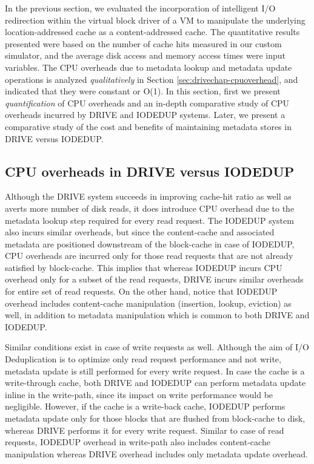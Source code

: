 
In the previous section, we evaluated the incorporation of
intelligent I/O redirection within the virtual block driver of a VM
to manipulate the underlying location-addressed cache as a content-addressed cache.
The quantitative results presented were based on the number of cache hits 
measured in our custom simulator, and the average disk access and memory 
access times were input variables. The CPU overheads due to metadata 
lookup and metadata update operations is analyzed \textit{qualitatively} 
in Section \ref{sec:drivechap-cpuoverhead}, and indicated that they were 
constant or O(1). 
In this section, first we present \textit{quantification} of CPU overheads and an
in-depth comparative study of CPU overheads incurred by DRIVE and
IODEDUP systems. Later, we present a comparative study of the cost
and benefits of maintaining metadata stores in DRIVE versus IODEDUP.

\subsection{CPU overheads in DRIVE versus IODEDUP}
Although the DRIVE system succeeds in improving cache-hit ratio
as well as averts more number of disk reads, it does introduce CPU overhead
due to the metadata lookup step required for every read request. The IODEDUP system
also incurs similar overheads, but since the content-cache and associated
metadata are positioned downstream of the block-cache in case of IODEDUP,
CPU overheads are incurred only for those read requests that are not
already satisfied by block-cache. This implies that whereas IODEDUP
incurs CPU overhead only for a subset of the read requests, DRIVE incurs
similar overheads for entire set of read requests.
On the other hand, notice that IODEDUP overhead includes content-cache
manipulation (insertion, lookup, eviction) as well, in addition to metadata
manipulation which is common to both DRIVE and IODEDUP.

Similar conditions exist in case of write requests as well. Although the
aim of I/O Deduplication is to optimize only read request performance and
not write, metadata update is still performed for every write request. In
case the cache is a write-through cache, both DRIVE and IODEDUP can
perform metadata update inline in the write-path, since its impact
on write performance would be negligible. However, if the cache is
a write-back cache, IODEDUP performs metadata update only for those blocks
that are flushed from block-cache to disk, whereas DRIVE performs it
for every write request. Similar to case of read requests, IODEDUP overhead
in write-path also includes content-cache manipulation whereas DRIVE
overhead includes only metadata update overhead.

